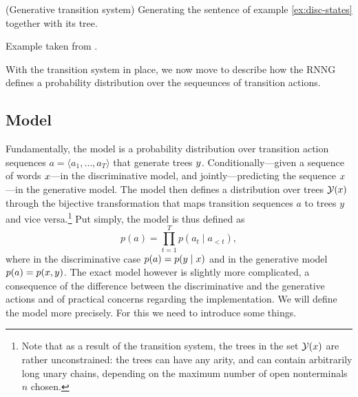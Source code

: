     \begin{example}{(Generative transition system)} Generating the sentence of example \ref{ex:disc-states} together with its tree.
      
      Example taken from \citet{dyer2016rnng}.
    \end{example}

    With the transition system in place, we now move to describe how the RNNG defines a probability distribution over the sequeunces of transition actions.

  \subsection{Model}
    Fundamentally, the model is a probability distribution over transition action sequences $a = \langle a_1, \dots, a_T \rangle$ that generate trees $y$.  Conditionally---given a sequence of words $x$---in the discriminative model, and jointly---predicting the sequence $x$---in the generative model. The model then defines a distribution over trees $\mathcal{Y}(x)$ through the bijective transformation that maps transition sequences $a$ to trees $y$ and vice versa.\footnote{ Note that as a result of the transition system, the trees in the set $\mathcal{Y}(x)$ are rather unconstrained: the trees can have any arity, and can contain arbitrarily long unary chains, depending on the maximum number of open nonterminals $n$ chosen.} Put simply, the model is thus defined as
    \begin{equation}
      \label{eq:naive-rnng-model}
      p( a ) = \prod_{t=1}^T p( a_t \mid a_{<t} ),
    \end{equation}
    where in the discriminative case $p( a ) = p( y \mid x )$ and in the generative model $p( a ) = p( x, y )$. The exact model however is slightly more complicated, a consequence of the difference between the discriminative and the generative actions and of practical concerns regarding the implementation. We will define the model more precisely. For this we need to introduce some things.

